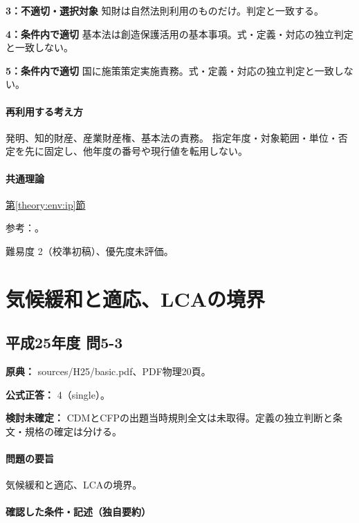\noindent\textbf{3：不適切・選択対象} 知財は自然法則利用のものだけ。判定と一致する。\par

\noindent\textbf{4：条件内で適切} 基本法は創造保護活用の基本事項。式・定義・対応の独立判定と一致しない。\par

\noindent\textbf{5：条件内で適切} 国に施策策定実施責務。式・定義・対応の独立判定と一致しない。\par

\paragraph{再利用する考え方} 発明、知的財産、産業財産権、基本法の責務。 指定年度・対象範囲・単位・否定を先に固定し、他年度の番号や現行値を転用しない。

\paragraph{共通理論} \hyperref[theory:env:ip]{第\ref*{theory:env:ip}節}

\par 参考：\cite{ip_patent_statute,ip_broad_scope}。

\par 難易度 2（校準初稿）、優先度未評価。

\section{気候緩和と適応、LCAの境界}

\subsection{平成25年度 問5-3}
\label{q:h25-reg-basic-5-3}

\noindent\textbf{原典：} sources/H25/basic.pdf、PDF物理20頁。

\textbf{公式正答：} 4（single）。

\par\textbf{検討未確定：} CDMとCFPの出題当時規則全文は未取得。定義の独立判断と条文・規格の確定は分ける。

\paragraph{問題の要旨} 気候緩和と適応、LCAの境界。

\paragraph{確認した条件・記述（独自要約）}\mbox{}\par

